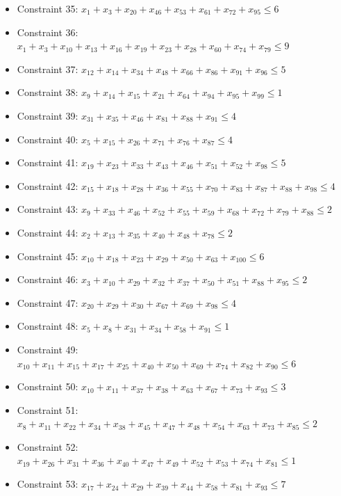 \documentclass[11pt]{article}
\begin{document}
\begin{itemize}
\item Constraint 35: $x_{1} + x_{3} + x_{20} + x_{46} + x_{53} + x_{61} + x_{72} + x_{95} \le 6$
\item Constraint 36: $x_{1} + x_{3} + x_{10} + x_{13} + x_{16} + x_{19} + x_{23} + x_{28} + x_{60} + x_{74} + x_{79} \le 9$
\item Constraint 37: $x_{12} + x_{14} + x_{34} + x_{48} + x_{66} + x_{86} + x_{91} + x_{96} \le 5$
\item Constraint 38: $x_{9} + x_{14} + x_{15} + x_{21} + x_{64} + x_{94} + x_{95} + x_{99} \le 1$
\item Constraint 39: $x_{31} + x_{35} + x_{46} + x_{81} + x_{88} + x_{91} \le 4$
\item Constraint 40: $x_{5} + x_{15} + x_{26} + x_{71} + x_{76} + x_{87} \le 4$
\item Constraint 41: $x_{19} + x_{23} + x_{33} + x_{43} + x_{46} + x_{51} + x_{52} + x_{98} \le 5$
\item Constraint 42: $x_{15} + x_{18} + x_{28} + x_{36} + x_{55} + x_{70} + x_{83} + x_{87} + x_{88} + x_{98} \le 4$
\item Constraint 43: $x_{9} + x_{33} + x_{46} + x_{52} + x_{55} + x_{59} + x_{68} + x_{72} + x_{79} + x_{88} \le 2$
\item Constraint 44: $x_{2} + x_{13} + x_{35} + x_{40} + x_{48} + x_{78} \le 2$
\item Constraint 45: $x_{10} + x_{18} + x_{23} + x_{29} + x_{50} + x_{63} + x_{100} \le 6$
\item Constraint 46: $x_{3} + x_{10} + x_{29} + x_{32} + x_{37} + x_{50} + x_{51} + x_{88} + x_{95} \le 2$
\item Constraint 47: $x_{20} + x_{29} + x_{30} + x_{67} + x_{69} + x_{98} \le 4$
\item Constraint 48: $x_{5} + x_{8} + x_{31} + x_{34} + x_{58} + x_{91} \le 1$
\item Constraint 49: $x_{10} + x_{11} + x_{15} + x_{17} + x_{25} + x_{40} + x_{50} + x_{69} + x_{74} + x_{82} + x_{90} \le 6$
\item Constraint 50: $x_{10} + x_{11} + x_{37} + x_{38} + x_{63} + x_{67} + x_{73} + x_{93} \le 3$
\item Constraint 51: $x_{8} + x_{11} + x_{22} + x_{34} + x_{38} + x_{45} + x_{47} + x_{48} + x_{54} + x_{63} + x_{73} + x_{85} \le 2$
\item Constraint 52: $x_{19} + x_{26} + x_{31} + x_{36} + x_{40} + x_{47} + x_{49} + x_{52} + x_{53} + x_{74} + x_{81} \le 1$
\item Constraint 53: $x_{17} + x_{24} + x_{29} + x_{39} + x_{44} + x_{58} + x_{81} + x_{93} \le 7$

\end{itemize}
\end{document}
